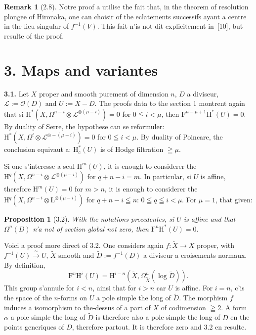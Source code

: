 \documentclass[12pt,a4paper]{article}
\theoremstyle{plain}
\newtheorem{proposition}[theorem]{Proposition}
\theoremstyle{definition}
\newtheorem{remark}[theorem]{Remark}
\begin{document}
\begin{remark}[2.8]
Notre proof a utilise the fait that, in the theorem of resolution plongee of Hironaka, one can choisir of the eclatements successifs ayant a centre in the lieu singular of $f^{-1}(V)$. This fait n'is not dit explicitement in~[10], but resulte of the proof.
\end{remark}


\section*{3. Maps and variantes}

\textbf{3.1.} Let $X$ proper and smooth purement of dimension $n$, $D$ a diviseur, $\mathscr{L} := \mathscr{O}(D)$ and $U := X - D$. The proofs data to the section 1 montrent again that si $\mathrm{H}^*(X, \Omega^{n-i} \otimes \mathscr{L}^{\otimes(\mu-i)}) = 0$ for $0 \leqq i < \mu$, then $\mathrm{F}^{n-\mu+1} \mathrm{H}^*(U) = 0$. By duality of Serre, the hypothese can se reformuler: $\mathrm{H}^*(X, \Omega^i \otimes \mathscr{L}^{\otimes -(\mu-i)}) = 0$ for $0 \leqq i < \mu$. By duality of Poincare, the conclusion equivaut a: $\mathrm{H}_c^*(U)$ is of Hodge filtration $\geqq \mu$.

Si one s'interesse a seul $\mathrm{H}^m(U)$, it is enough to considerer the $\mathrm{H}^q(X, \Omega^{n-i} \otimes \mathscr{L}^{\otimes (\mu-i)})$ for $q + n - i = m$. In particular, si $U$ is affine, therefore $\mathrm{H}^m(U) = 0$ for $m > n$, it is enough to considerer the $\mathrm{H}^q(X, \Omega^{n-i} \otimes \mathrm{L}^{\otimes (\mu-i)})$ for $q + n - i \leqq n$: $0 \leqq q \leqq i < \mu$. For $\mu = 1$, that given:

\begin{proposition}[3.2]
With the notations precedentes, si $U$ is affine and that $\Omega^n(D)$ n'a not of section global not zero, then $\mathrm{F}^n \mathrm{H}^*(U) = 0$.
\end{proposition}

Voici a proof more direct of 3.2. One considers again $f : \tilde{X} \to X$ proper, with $f^{-1}(U) \xrightarrow{\;\sim\;} U$, $\tilde{X}$ smooth and $\tilde{D} := f^{-1}(D)$ a diviseur a croisements normaux. By definition,
\[
\mathrm{F}^n \mathrm{H}^i(U) = \mathrm{H}^{i-n}(\tilde{X}, \Omega_{\tilde{X}}^n(\log \tilde{D})).
\]
This group s'annule for $i < n$, ainsi that for $i > n$ car $U$ is affine. For $i = n$, c'is the space of the $n$-forms on $U$ a pole simple the long of $\tilde{D}$. The morphism $f$ induces a isomorphism to the-dessus of a part of $X$ of codimension $\geqq 2$. A form $\alpha$ a pole simple the long of $\tilde{D}$ is therefore also a pole simple the long of $D$ en the points generiques of $D$, therefore partout. It is therefore zero and 3.2 en resulte.
\end{document}

